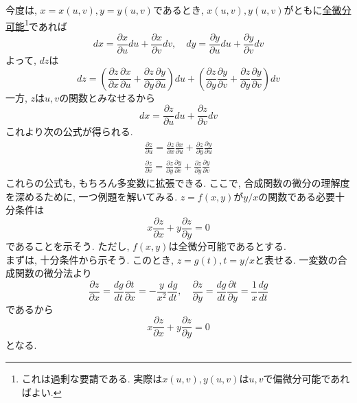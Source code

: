 \documentclass[a4j,dvipdfmx]{jsarticle}
\numberwithin{equation}{section}
\begin{document}
            今度は, $x=x(u,v),y=y(u,v)$であるとき, $x(u,v),y(u,v)$がともに\underline{全微分可能}\footnote{これは過剰な要請である. 実際は$x(u,v),y(u,v)$は$u,v$で偏微分可能であればよい.}であれば
            \begin{equation*}
                dx=\frac{\partial x}{\partial u}du+\frac{\partial x}{\partial v}dv,\quad dy=\frac{\partial y}{\partial u}du+\frac{\partial y}{\partial v}dv
            \end{equation*}
            よって, $dz$は
            \begin{equation*}
                dz=\left(\frac{\partial z}{\partial x}\frac{\partial x}{\partial u}+\frac{\partial z}{\partial y}\frac{\partial y}{\partial u}\right)du+\left(\frac{\partial z}{\partial y}\frac{\partial y}{\partial v}+\frac{\partial z}{\partial y}\frac{\partial y}{\partial v}\right)dv
            \end{equation*}
            一方, $z$は$u,v$の関数とみなせるから
            \begin{equation*}
                dx=\frac{\partial z}{\partial u}du+\frac{\partial z}{\partial v}dv
            \end{equation*}
            これより次の公式が得られる.
            \begin{align}
                \frac{\partial z}{\partial u}=\frac{\partial z}{\partial x}\frac{\partial x}{\partial u}+\frac{\partial z}{\partial y}\frac{\partial y}{\partial u} \label{eq:偏微分:合成関数の微分u}\\
                \frac{\partial z}{\partial v}=\frac{\partial z}{\partial y}\frac{\partial y}{\partial v}+\frac{\partial z}{\partial y}\frac{\partial y}{\partial v} \label{eq:偏微分:合成関数の微分v}
            \end{align}
            これらの公式も, もちろん多変数に拡張できる. 
            \clearpage
            ここで, 合成関数の微分の理解度を深めるために, 一つ例題を解いてみる. $z=f(x,y)$が$y/x$の関数である必要十分条件は
            \begin{equation*}
                x\frac{\partial z}{\partial x}+y\frac{\partial z}{\partial y}=0
            \end{equation*}
            であることを示そう. ただし, $f(x,y)$は全微分可能であるとする.\\

            まずは, 十分条件から示そう. このとき, $z=g(t),t=y/x$と表せる. 一変数の合成関数の微分法より
            \begin{equation*}
                \frac{\partial z}{\partial x}=\frac{dg}{dt}\frac{\partial t}{\partial x}=-\frac{y}{x^2}\frac{dg}{dt},\quad \frac{\partial z}{\partial y}=\frac{dg}{dt}\frac{\partial t}{\partial y}=\frac{1}{x}\frac{dg}{dt}
            \end{equation*}
            であるから
            \begin{equation*}
                x\frac{\partial z}{\partial x}+y\frac{\partial z}{\partial y}=0
            \end{equation*}
            となる.
\end{document}
